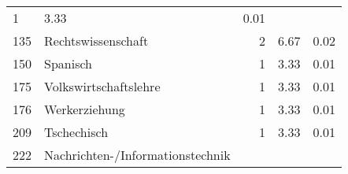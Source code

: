 \begin{longtable}{lXrrr}
       \num{1} &
       \num[round-mode=places,round-precision=2]{3.33} &
         \num[round-mode=places,round-precision=2]{0.01} \\

     135 &
     \multicolumn{1}{X}{ Rechtswissenschaft   } &


       \num{2} &
       \num[round-mode=places,round-precision=2]{6.67} &
         \num[round-mode=places,round-precision=2]{0.02} \\

     150 &
     \multicolumn{1}{X}{ Spanisch   } &


       \num{1} &
       \num[round-mode=places,round-precision=2]{3.33} &
         \num[round-mode=places,round-precision=2]{0.01} \\

     175 &
     \multicolumn{1}{X}{ Volkswirtschaftslehre   } &


       \num{1} &
       \num[round-mode=places,round-precision=2]{3.33} &
         \num[round-mode=places,round-precision=2]{0.01} \\

     176 &
     \multicolumn{1}{X}{ Werkerziehung   } &


       \num{1} &
       \num[round-mode=places,round-precision=2]{3.33} &
         \num[round-mode=places,round-precision=2]{0.01} \\

     209 &
     \multicolumn{1}{X}{ Tschechisch   } &


       \num{1} &
       \num[round-mode=places,round-precision=2]{3.33} &
         \num[round-mode=places,round-precision=2]{0.01} \\

     222 &
     \multicolumn{1}{X}{ Nachrichten-/Informationstechnik   } &



\end{longtable}
